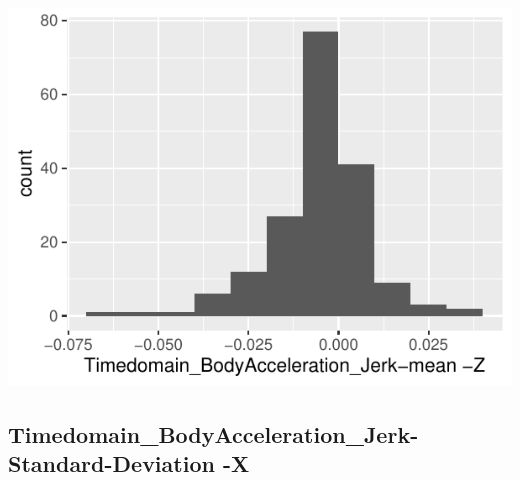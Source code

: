 \documentclass[
]{article}
\begin{document}
\begin{minipage}{0.25 \textwidth}

\includegraphics{codebook_tidydatasub_files/figure-latex/Var-17-Timedomain-BodyAcceleration-Jerk-mean--Z-1.pdf}

\end{minipage}

\noindent\makebox[\linewidth]{\rule{\textwidth}{0.4pt}}

\hypertarget{timedomain_bodyacceleration_jerk-standard-deviation--x}{%
\subsection{Timedomain\_BodyAcceleration\_Jerk-Standard-Deviation
-X}\label{timedomain_bodyacceleration_jerk-standard-deviation--x}}
\end{document}
